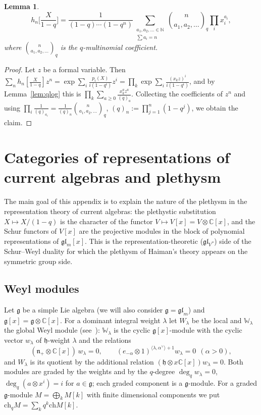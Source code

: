 \documentclass[11pt]{amsart}
\numberwithin{equation}{section}
\newtheorem{lemma}[equation]{Lemma}
\theoremstyle{definition}
\newcommand{\gl}{\mathfrak{gl}}
\newcommand{\fg}{\mathfrak{g}}
\newcommand{\fh}{\mathfrak{h}}
\newcommand{\fn}{\mathfrak{n}}
\newcommand{\bW}{\mathbb{W}}          %
\newcommand{\ch}{\mathrm{ch}}
\begin{document}
	\begin{lemma}\label{lem:pleth-h}
		\[
		h_n\Big[\frac X{1-q}\Big]=\frac1{(1-q)\cdots(1-q^n)}\sum_{\substack{a_1,a_2,\dots\in\mathbb N\\ \sum a_i=n}}\binom n{a_1,a_2,\dots}_q\prod_ix_i^{a_i},
		\]
		where $\binom n{a_1,a_2,\dots}_q$ is the $q$-multinomial coefficient.
	\end{lemma}
	\begin{proof}
		Let $z$ be a formal variable. Then $\sum_{n}h_n[\tfrac X{1-q}]z^n=\exp\sum_{i}\frac{p_i(X)}{i(1-q^i)}z^i=\prod_k\exp\sum_i\frac{(x_k z)^i}{i(1-q^i)}$, and by Lemma~\ref{lem:qlog} this is $\prod_k\sum_{a\ge0}\frac{x_k^a z^a}{(q)_a}$. Collecting the coefficients of $z^n$ and using $\prod_i\frac1{(q)_{a_i}}=\frac1{(q)_n}\binom n{a_1,a_2,\dots}_q$, $(q)_n:=\prod_{j=1}^n(1-q^j)$, we obtain the claim.
	\end{proof}
	
	\section{Categories of representations of current algebras and plethysm}\label{app:categories}
	
	The main goal of this appendix is to explain the nature of the plethysm in the representation theory of current algebras: the plethystic substitution $X\mapsto X/(1-q)$ is the character of the functor $V\mapsto V[x]=V\otimes\mathbb{C}[x]$, and the Schur functors of $V[x]$ are the projective modules in the block of polynomial representations of $\gl_m[x]$. This is the representation-theoretic ($\gl_V$-) side of the Schur--Weyl duality for which the plethysm of Haiman's theory appears on the symmetric group side.
	
	\subsection{Weyl modules}\label{ssec:app-weyl}
	Let $\fg$ be a simple Lie algebra (we will also consider $\fg=\gl_m$) and $\fg[x]=\fg\otimes\mathbb{C}[x]$. For a dominant integral weight $\lambda$ let $W_\lambda$ be the local and $\bW_\lambda$ the global Weyl module (see~\cite{CFK}): $\bW_\lambda$ is the cyclic $\fg[x]$-module with the cyclic vector $w_\lambda$ of $\fh$-weight $\lambda$ and the relations
	\[
	(\fn_+\otimes\mathbb{C}[x])\,w_\lambda=0,\qquad(e_{-\alpha}\otimes1)^{\langle\lambda,\alpha^\vee\rangle+1}w_\lambda=0\ \ (\alpha>0),
	\]
	and $W_\lambda$ is its quotient by the additional relation $(\fh\otimes x\mathbb{C}[x])w_\lambda=0$. Both modules are graded by the weights and by the $q$-degree $\deg_qw_\lambda=0$, $\deg_q(a\otimes x^i)=i$ for $a\in\fg$; each graded component is a $\fg$-module. For a graded $\fg$-module $M=\bigoplus_kM[k]$ with finite dimensional components we put $\ch_qM=\sum_kq^k\ch M[k]$. 
	
\end{document}
